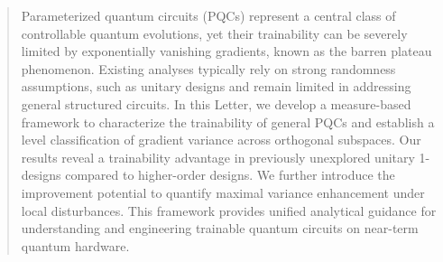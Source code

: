 \documentclass[%
 superscriptaddress,
 aps,prl,
 reprint,
 twocolumn,
 amsmath,amssymb,showpacs,
 bibnotes,
]{revtex4-2}
\begin{document}
\begin{abstract}

Parameterized quantum circuits (PQCs) represent a central class of controllable quantum evolutions, yet their trainability can be severely limited by exponentially vanishing gradients, known as the barren plateau phenomenon. Existing analyses typically rely on strong randomness assumptions, such as unitary designs and remain limited in addressing general structured circuits.
In this Letter, we develop a measure-based framework to characterize the trainability of general PQCs and establish a level classification of gradient variance across orthogonal subspaces. Our results reveal a trainability advantage in previously unexplored unitary 1-designs compared to higher-order designs. We further introduce the improvement potential to quantify maximal variance enhancement under local disturbances. This framework provides unified analytical guidance for understanding and engineering trainable quantum circuits on near-term quantum hardware.



\end{abstract}
\end{document}
